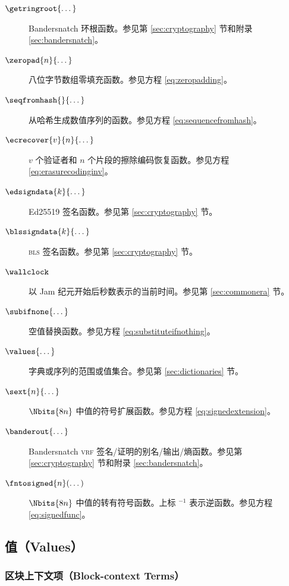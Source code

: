 \begin{description}
  \item[$\getringroot{\dots}$] Bandersnatch 环根函数。参见第 \ref{sec:cryptography} 节和附录 \ref{sec:bandersnatch}。
  \item[$\zeropad{n}{\dots}$] 八位字节数组零填充函数。参见方程 \ref{eq:zeropadding}。
  \item[$\seqfromhash{}{\dots}$] 从哈希生成数值序列的函数。参见方程 \ref{eq:sequencefromhash}。
  \item[$\ecrecover{v}{n}{\dots}$] $v$ 个验证者和 $n$ 个片段的擦除编码恢复函数。参见方程 \ref{eq:erasurecodinginv}。
  \item[$\edsigndata{k}{\dots}$] Ed25519 签名函数。参见第 \ref{sec:cryptography} 节。
  \item[$\blssigndata{k}{\dots}$] \textsc{bls} 签名函数。参见第 \ref{sec:cryptography} 节。
  \item[$\wallclock$] 以 Jam 纪元开始后秒数表示的当前时间。参见第 \ref{sec:commonera} 节。
  \item[$\subifnone{\dots}$] 空值替换函数。参见方程 \ref{eq:substituteifnothing}。
  \item[$\values{\dots}$] 字典或序列的范围或值集合。参见第 \ref{sec:dictionaries} 节。
  \item[$\sext{n}{\dots}$] $\Nbits{8n}$ 中值的符号扩展函数。参见方程 \ref{eq:signedextension}。
  \item[$\banderout{\dots}$] Bandersnatch \textsc{vrf} 签名/证明的别名/输出/熵函数。参见第 \ref{sec:cryptography} 节和附录 \ref{sec:bandersnatch}。
  \item[$\fntosigned{n}(\dots)$] $\Nbits{8n}$ 中值的转有符号函数。上标 ${}^{-1}$ 表示逆函数。参见方程 \ref{eq:signedfunc}。
\end{description}

\subsection{值（Values）}

\subsubsection{区块上下文项（Block-context Terms）}

